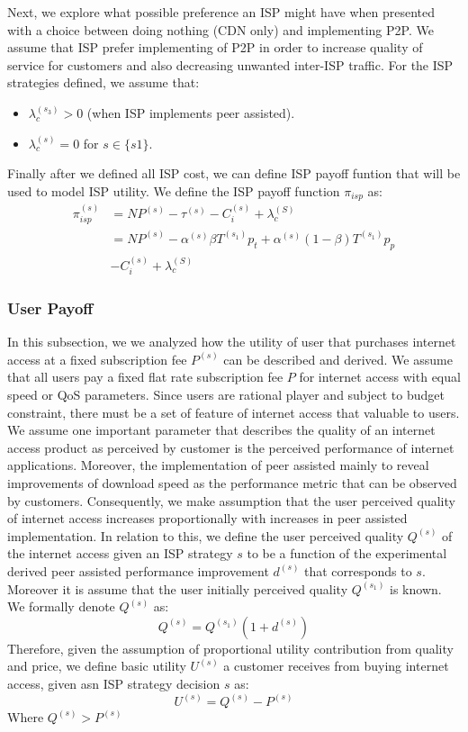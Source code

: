 \documentclass[paper]{ieice}
\begin{document}
Next, we explore what possible preference an ISP might have when presented with a choice between doing nothing (CDN only) and implementing P2P.
We assume that ISP prefer implementing of P2P in order to increase quality of service for customers and also decreasing unwanted inter-ISP traffic.
For the ISP strategies defined, we assume that:
\begin{itemize}
	\item $\lambda_c^{(s_3)} > 0$ (when ISP implements peer assisted).
	\item $\lambda_c^{(s)} = 0$ for $s \in \{s1\}$.
\end{itemize}
Finally after we defined all ISP cost, we can define ISP payoff funtion that will be used to model ISP utility.  
We define the ISP payoff function $\pi_{isp}$ as:
\begin{align}
	\pi_{isp}^{(s)} &= N P^{(s)} - \tau^{(s)} - C_i^{(s)} + \lambda_c^{(S)} \\
	\nonumber       &= N P^{(s)} - \alpha^{(s)} \beta T^{(s_1)} p_t + \alpha^{(s)} (1-\beta) T^{(s_1)} p_p \\ 
	                &- C_i^{(s)} + \lambda_c^{(S)}
\end{align}

\subsubsection{User Payoff}
In this subsection, we we analyzed how the utility of user that purchases internet access at a fixed subscription fee $P^{(s)}$ can be described and derived. 
We assume that all users pay a fixed flat rate subscription fee $P$ for internet access with equal speed or QoS parameters.
Since users are rational player and subject to budget constraint, there must be a set of feature of internet access that valuable to users.
We assume one important parameter that describes the quality of an internet access product as perceived by customer is the perceived performance of internet applications.  
Moreover, the implementation of peer assisted mainly to reveal improvements of download speed as the performance metric that can be observed by customers.
Consequently, we make assumption that the user perceived quality of internet access increases proportionally with increases in peer assisted implementation. 
In relation to this, we define the user perceived quality $Q^{(s)}$ of the internet access given an ISP strategy $s$ to be a function of the experimental derived peer assisted performance improvement $d^{(s)}$ that corresponds to $s$. 
Moreover it is assume that the user initially perceived quality $Q^{(s_1)}$ is known. 
We formally denote $Q^{(s)}$ as:
\begin{equation}
	Q^{(s)} = Q^{(s_1)} (1 + d^{(s)})
\end{equation}
Therefore, given the assumption of proportional utility contribution from quality and price, we define basic utility $U^{(s)}$ a customer receives from buying internet access, given asn ISP strategy decision $s$ as:
\begin{equation}
	U^{(s)} = Q^{(s)} - P^{(s)}
\end{equation}
Where $Q^{(s)} > P^{(s)}$
\end{document}
